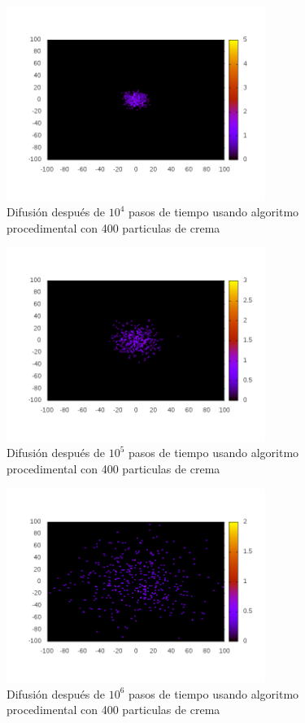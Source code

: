 \documentclass[12pt,twocolumn]{article}
\begin{document}
\begin{figure}
    \centering
    \includegraphics[width=0.75\textwidth]{figs/t_1e4.png}
    \caption{Difusión después de $10^4$ pasos de tiempo usando 
        algoritmo procedimental con 400 particulas de crema}
    \label{fig:t1e4}
\end{figure}

\begin{figure}
    \centering
    \includegraphics[width=0.75\textwidth]{figs/t_1e5.png}
    \caption{Difusión después de $10^5$ pasos de tiempo usando 
        algoritmo procedimental con 400 particulas de crema}
    \label{fig:t1e5}
\end{figure}

\begin{figure}
    \centering
    \includegraphics[width=0.75\textwidth]{figs/t_1e6.png}
    \caption{Difusión después de $10^6$ pasos de tiempo usando 
        algoritmo procedimental con 400 particulas de crema}
    \label{fig:t1e6}
\end{figure}
\end{document}
